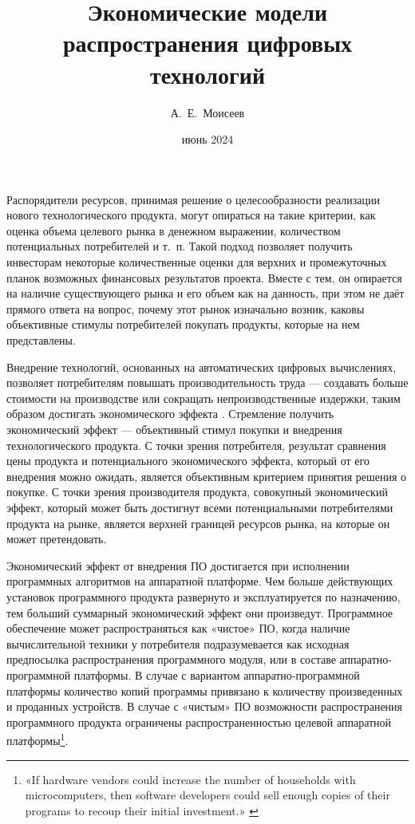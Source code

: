 \documentclass{article}
\title{Экономические модели распространения цифровых технологий}
\author{А.~Е.~Моисеев}
\date{июнь 2024}
\begin{document}
\maketitle

Распорядители ресурсов, принимая решение о целесообразности реализации нового технологического продукта, могут опираться на такие критерии, как оценка объема целевого рынка в денежном выражении, количеством потенциальных потребителей и т.~п. Такой подход позволяет получить инвесторам некоторые количественные оценки для верхних и промежуточных планок возможных финансовых результатов проекта. Вместе с тем, он опирается на наличие существующего рынка и его объем как на данность, при этом не даёт прямого ответа на вопрос, почему этот рынок изначально возник, каковы объективные стимулы потребителей покупать продукты, которые на нем представлены.

Внедрение технологий, основанных на автоматических цифровых вычислениях, позволяет потребителям повышать производительность труда — создавать больше стоимости на производстве или сокращать непроизводственные издержки, таким образом достигать экономического эффекта \cite{ecoEffects}. Стремление получить экономический эффект — объективный стимул покупки и внедрения технологического продукта. С точки зрения потребителя, результат сравнения цены продукта и потенциального экономического эффекта, который от его внедрения можно ожидать, является объективным критерием принятия решения о покупке. С точки зрения производителя продукта, совокупный экономический эффект, который может быть достигнут всеми потенциальными потребителями продукта на рынке, является верхней границей ресурсов рынка, на которые он может претендовать.

Экономический эффект от внедрения ПО достигается при исполнении программных алгоритмов на аппаратной платформе. Чем больше действующих установок программного продукта развернуто и эксплуатируется по назначению, тем больший суммарный экономический эффект они произведут. Программное обеспечение может распространяться как «чистое» ПО, когда наличие вычислительной техники у потребителя подразумевается как исходная предпосылка распространения программного модуля, или в составе аппаратно-программной платформы. В случае с вариантом аппаратно-программной платформы количество копий программы привязано к количеству произведенных и проданных устройств. В случае с «чистым» ПО возможности распространения программного продукта ограничены распространенностью целевой аппаратной платформы\footnote{«If hardware vendors could increase the number of households with microcomputers, then software developers could sell enough copies of their programs to recoup their initial investment.» \cite{driscollOpenLetter}}.
\end{document}
